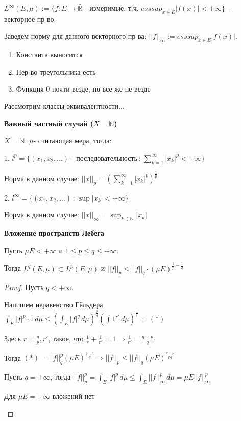 \begin{definition}
    $L^{\infty} (E, \mu) := \{ f: E \rightarrow \bar{\mathbb{R}}$ - измеримые, т.ч. $esssup_{x\in E} |f(x)| < +\infty \}$ - векторное пр-во.

    Заведем норму для данного векторного пр-ва: $|| f ||_{\infty} := esssup_{x\in E} |f(x)|$.

    \begin{enumerate}
        \item Константа выносится
        \item Нер-во треугольника есть
        \item Функция 0 почти везде, но все же не везде
    \end{enumerate}

    Рассмотрим классы эквивалентности...

    \textbf{Важный частный случай ($X = \mathbb{N}$)}

    $X = \mathbb{N}$, $\mu$- считающая мера, тогда:

    1. $l^p = \{ (x_1, x_2, \ldots) \text{ - последовательность} \, : \, \sum_{k = 1}^{\infty} |x_k|^p < +\infty \}$

        Норма в данном случае: $|| x ||_p = \left( \sum_{k = 1}^{\infty} |x_k|^p \right)^{\frac{1}{p}}$

    2. $l^\infty = \{ (x_1, x_2, \ldots) \, : \, \sup |x_k| < +\infty \}$

        Норма в данном случае: $|| x ||_{\infty} = \sup_{k \in \mathbb{N}} |x_k|$
\end{definition}

\begin{theorem}
    \textbf{Вложение пространств Лебега}

    Пусть $\mu E < +\infty$ и $1 \leqslant p \leqslant q \leqslant +\infty$.

    Тогда $L^q (E, \mu) \subset L^p (E, \mu)$ и $||f||_p \leqslant ||f||_q \cdot (\mu E)^{\frac{1}{p}-\frac{1}{q}}$
\end{theorem}

\begin{proof}
    Пусть $q < +\infty$.

    Напишем неравенство Гёльдера $\int_E |f|^p \cdot 1 \, d\mu \leqslant \left( \int_E |f|^q \, d\mu \right)^{\frac{p}{q}} \left( \int 1^{r'} \, d\mu \right)^{\frac{1}{r'}} = (*)$

    Здесь $r = \frac{q}{p}, r'$, такое, что $\frac{1}{r} + \frac{1}{r'} = 1 \Rightarrow \frac{1}{r'} = \frac{q - p}{q}$

    Тогда $(*) = ||f||_q^p (\mu E)^{\frac{q - p}{q}} \Rightarrow ||f||_p \leqslant ||f||_q (\mu E)^{\frac{q - p}{pq}}$

    Пусть $q = +\infty$, тогда $||f||_p^p = \int_E |f|^p \, d\mu \leqslant \int_E ||f||_\infty^p \, d\mu = \mu E ||f||_\infty^p$

    \begin{remark}
        Для $\mu E = +\infty$ вложений нет
    \end{remark}
\end{proof}


